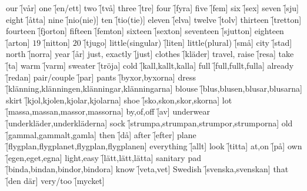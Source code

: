 \begin{questions}
    \begin{multicols}{3}
        \raggedcolumns
        \question our \f[vår]
        \question one \f[en/ett]
        \question two \f[två]
        \question three \f[tre]
        \question four \f[fyra]
        \question five \f[fem]
        \question six \f[sex]
        \question seven \f[sju]
        \question eight \f[åtta]
        \question nine \f[nio(nie)]
        \question ten \f[tio(tie)]
        \question eleven \f[elva]
        \question twelve \f[tolv]
        \question thirteen \f[tretton]
        \question fourteen \f[fjorton]
        \question fifteen \f[femton]
        \question sixteen \f[sexton]
        \question seventeen \f[sjutton]
        \question eighteen \f[arton]
        \question $19$ \f[nitton]
        \question $20$ \f[tjugo]
        \question little(singular) \f[liten]
        \question little(plural) \f[små]
        \question city \f[stad]
        \question north \f[norra]
        \question year \f[år]
        \question just, exactly \f[just]
        \question clothes \f[kläder]
        \question travel, raise \f[resa]
        \question take \f[ta]
        \question warm  \f[varm]
        \question sweater \f[tröja]
        \question cold \f[kall,kallt,kalla]
        \question full \f[full,fullt,fulla]
        \question already \f[redan]
        \question pair/couple \f[par]
        \question pants \f[byxor,byxorna]
        \question dress \f[klänning,klänningen,klänningar,klänningarna]
        \question blouse \f[blus,blusen,blusar,blusarna]
        \question skirt \f[kjol,kjolen,kjolar,kjolarna]
        \question shoe \f[sko,skon,skor,skorna]
        \question lot \f[massa,massan,massor,massorna]
        \question by,of,off \f[av]
        \question underwear \f[underkläder,underkläderna]
        \question sock \f[strumpa,strumpan,strumpor,strumporna]
        \question old \f[gammal,gammalt,gamla]
        \question then \f[då]
        \question after \f[efter]
        \question plane \f[flygplan,flygplanet,flygplan,flygplanen]
        \question everything \f[allt]
        \question look \f[titta]
        \question at,on \f[på]
        \question own \f[egen,eget,egna]
        \question light,easy \f[lätt,lätt,lätta]
        \question sanitary pad \f[binda,bindan,bindor,bindora]
        \question know \f[veta,vet]
        \question Swedish \f[svenska,svenskan]
        \question that \f[den där]
        \question very/too \f[mycket]
    \end{multicols}
\end{questions}